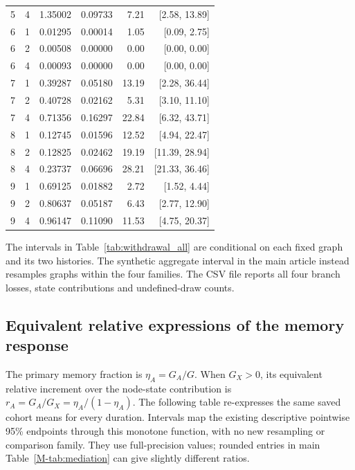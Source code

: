 \documentclass[preprint,11pt,sort&compress]{elsarticle}
\begin{document}
\begin{longtable}{rrrrrr}
5 & 4 & 1.35002 & 0.09733 & 7.21 & [2.58, 13.89]\\
6 & 1 & 0.01295 & 0.00014 & 1.05 & [0.09, 2.75]\\
6 & 2 & 0.00508 & 0.00000 & 0.00 & [0.00, 0.00]\\
6 & 4 & 0.00093 & 0.00000 & 0.00 & [0.00, 0.00]\\
7 & 1 & 0.39287 & 0.05180 & 13.19 & [2.28, 36.44]\\
7 & 2 & 0.40728 & 0.02162 & 5.31 & [3.10, 11.10]\\
7 & 4 & 0.71356 & 0.16297 & 22.84 & [6.32, 43.71]\\
8 & 1 & 0.12745 & 0.01596 & 12.52 & [4.94, 22.47]\\
8 & 2 & 0.12825 & 0.02462 & 19.19 & [11.39, 28.94]\\
8 & 4 & 0.23737 & 0.06696 & 28.21 & [21.33, 36.46]\\
9 & 1 & 0.69125 & 0.01882 & 2.72 & [1.52, 4.44]\\
9 & 2 & 0.80637 & 0.05187 & 6.43 & [2.77, 12.90]\\
9 & 4 & 0.96147 & 0.11090 & 11.53 & [4.75, 20.37]\\
\bottomrule\end{longtable}
The intervals in Table~\ref{tab:withdrawal_all} are conditional on each fixed graph and its two histories. The synthetic aggregate interval in the main article instead resamples graphs within the four families. The CSV file reports all four branch losses, state contributions and undefined-draw counts.

\subsection{Equivalent relative expressions of the memory response}
The primary memory fraction is $\eta_A=G_A/G$. When $G_X>0$, its equivalent relative increment over the node-state contribution is $r_A=G_A/G_X=\eta_A/(1-\eta_A)$. The following table re-expresses the same saved cohort means for every duration. Intervals map the existing descriptive pointwise 95\% endpoints through this monotone function, with no new resampling or comparison family. They use full-precision values; rounded entries in main Table~\ref{M-tab:mediation} can give slightly different ratios.
\end{document}
